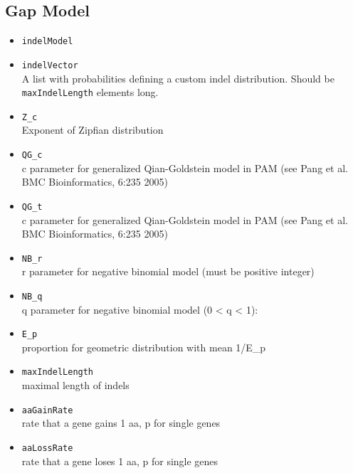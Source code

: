 \documentclass[11pt]{article}
\begin{document}
\subsection{Gap Model}
\begin{itemize}
\item{\texttt{indelModel}} \hfill \\
\item{\texttt{indelVector}} \hfill \\
A list with probabilities defining a custom indel distribution. Should be \texttt{maxIndelLength} elements long.
\item{\texttt{Z\_c}} \hfill \\
Exponent of Zipfian distribution
\item{\texttt{QG\_c}} \hfill \\
c parameter for generalized Qian-Goldstein model in PAM (see Pang et al. BMC Bioinformatics, 6:235 2005)
\item{\texttt{QG\_t}} \hfill \\
c parameter for generalized Qian-Goldstein model in PAM (see Pang et al. BMC Bioinformatics, 6:235 2005)
\item{\texttt{NB\_r}} \hfill \\
r parameter for negative binomial model (must be positive integer)
\item{\texttt{NB\_q}} \hfill \\
q parameter for negative binomial model (0 < q < 1):
\item{\texttt{E\_p}} \hfill \\
proportion for geometric distribution with mean 1/E\_p
\item{\texttt{maxIndelLength}} \hfill \\
maximal length of indels

\item{\texttt{aaGainRate}} \hfill \\
rate that a gene gains 1 aa, p for single genes
\item{\texttt{aaLossRate}} \hfill \\
rate that a gene loses 1 aa, p for single genes
\end{itemize}
\end{document}
